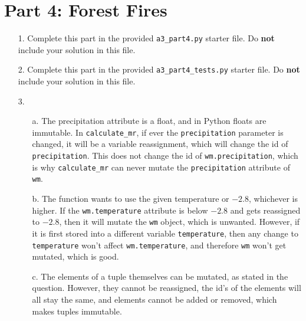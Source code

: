 \documentclass[fontsize=11pt]{article}
\begin{document}
\section*{Part 4: Forest Fires}

\begin{enumerate}
\item[1.]
Complete this part in the provided \texttt{a3\_part4.py} starter file.
Do \textbf{not} include your solution in this file.

\item[2.]
Complete this part in the provided \texttt{a3\_part4\_tests.py} starter file.
Do \textbf{not} include your solution in this file.

\item[3.]

\begin{enumerate}
\item[a.]
The precipitation attribute is a float, and in Python floats are immutable. In \texttt{calculate\_mr}, if ever the \texttt{precipitation} parameter is changed, it will be a variable reassignment, which will change the id of \texttt{precipitation}. This does not change the id of \texttt{wm.precipitation}, which is why \texttt{calculate\_mr} can never mutate the \texttt{precipitation} attribute of \texttt{wm}.

\item [b.]
The function wants to use the given temperature or $-2.8$, whichever is higher. If the \texttt{wm.temperature} attribute is below $-2.8$ and gets reassigned to $-2.8$, then it will mutate the \texttt{wm} object, which is unwanted. However, if it is first stored into a different variable \texttt{temperature}, then any change to \texttt{temperature} won't affect \texttt{wm.temperature}, and therefore \texttt{wm} won't get mutated, which is good.

\item[c.]
The elements of a tuple themselves can be mutated, as stated in the question. However, they cannot be reassigned, the id's of the elements will all stay the same, and elements cannot be added or removed, which makes tuples immutable.

\end{enumerate}

\end{enumerate}
\end{document}
